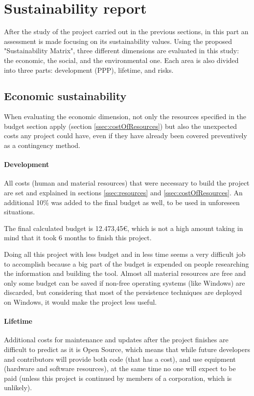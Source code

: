 \section{Sustainability report}
After the study of the project carried out in the previous sections, in this part an assessment is made focusing on its sustainability values. Using the proposed "Sustainability Matrix"\cite{susMatrix}, three different dimensions are evaluated in this study: the economic, the social, and the environmental one.
Each area is also divided into three parts: development (PPP), lifetime, and risks.


\subsection{Economic sustainability}
When evaluating the economic dimension, not only the resources specified in the budget section apply (section \ref{ssec:costOfResources}) but also the unexpected costs any project could have, even if they have already been covered preventively as a contingency method.

\paragraph{Development}
All costs (human and material resources) that were necessary to build the project are set and explained in sections \ref{ssec:resources} and \ref{ssec:costOfResources}. An additional 10\% was added to the final budget as well, to be used in unforeseen situations.

The final calculated budget is 12.473,45€, which is not a high amount taking in mind that it took 6 months to finish this project.

Doing all this project with less budget and in less time seems a very difficult job to accomplish because a big part of the budget is expended on people researching the information and building the tool. Almost all material resources are free and only some budget can be saved if non-free operating systems (like Windows) are discarded, but considering that most of the persistence techniques are deployed on Windows, it would make the project less useful.

\paragraph{Lifetime}
Additional costs for maintenance and updates after the project finishes are difficult to predict as it is Open Source, which means that while future developers and contributors will provide both code (that has a cost), and use equipment (hardware and software resources), at the same time no one will expect to be paid (unless this project is continued by members of a corporation, which is unlikely).   

